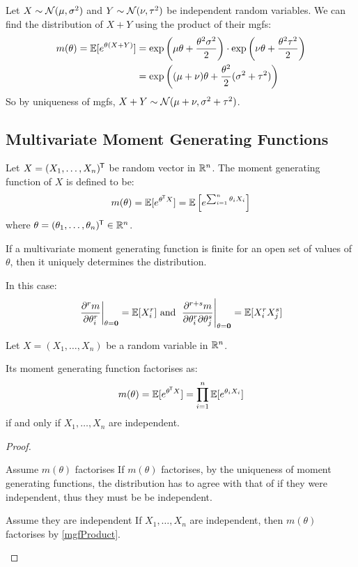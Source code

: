 \documentclass[../main.tex]{subfiles}
\begin{document}
\begin{example} \label{sumOfNormals}
  Let $X \sim \operatorname{\mathcal{N}}(\mu, \sigma^2)$ and $Y \sim \operatorname{\mathcal{N}}(\nu, \tau^2)$ be independent random variables.
  We can find the distribution of $X + Y$ using the product of their mgfs:
  \begin{align*}
    m(\theta) = \mathbb{E}[e^{\theta(X + Y)}] &= \exp\left(\mu \theta + \frac{\theta^2 \sigma^2}{2}\right) \cdot \exp\left(\nu \theta + \frac{\theta^2 \tau^2}{2}\right) \\
                                      &= \exp\left((\mu + \nu)\theta + \frac{\theta^2}{2}(\sigma^2 + \tau^2)\right)
  \end{align*}
  So by uniqueness of mgfs, $X + Y \sim \operatorname{\mathcal{N}}(\mu + \nu, \sigma^2 + \tau^2)$.
\end{example}
\subsection{Multivariate Moment Generating Functions}
\begin{definition}
  Let $X = (X_1, \ldots, X_n)^{{\mkern-1.5mu\mathsf{T}}}$ be random vector in $\mathbb{R}^{n}$.
  The moment generating function of $X$ is defined to be:
  \[
    m(\theta) = \mathbb{E}[e^{\theta^{{\mkern-1.5mu\mathsf{T}}} X}] = \mathbb{E}\left[e^{\sum_{i = 1}^{n} \theta_i X_i}\right]
  \]
  where $\theta = (\theta_1, \ldots, \theta_n)^{{\mkern-1.5mu\mathsf{T}}} \in \mathbb{R}^{n}$.
\end{definition}
\begin{theorem}
  If a multivariate moment generating function is finite for an open set of values of $\theta$, then it uniquely determines the distribution. \label{mgfMultiUnique}

  In this case:
  \[
    \at{\pderiv[r]{m}{\theta_i}}{\theta = \vec{0}} = \E[X^{r}_i] \text{ and } \at{\frac{\partial^{r + s}m}{\partial \theta_i^{r} \partial \theta_j^{s}}}{\theta = \vec{0}} = \E[X_i^{r}X_j^{s}]
  \]
\end{theorem}
\begin{proposition}
  Let $X = (X_1, \ldots, X_n)$ be a random variable in $\mathbb{R}^{n}$. \label{mgfFactor}

  Its moment generating function factorises as:
  \[
    m(\theta) = \mathbb{E}[e^{\theta^{{\mkern-1.5mu\mathsf{T}}}X}] = \prod_{i = 1}^{n} \mathbb{E}[e^{\theta_i X_i}]
  \]
  if and only if $X_1, \ldots, X_n$ are independent.
\end{proposition}
\begin{proof}
  \begin{proofdirection}{Assume $m(\theta)$ factorises}
    If $m(\theta)$ factorises, by the uniqueness of moment generating functions, the distribution has to agree with that of if they were independent, thus they must be be independent.
  \end{proofdirection}
  \begin{proofdirection}{Assume they are independent}
    If $X_1, \ldots, X_n$ are independent, then $m(\theta)$ factorises by \cref{mgfProduct}.
  \end{proofdirection}
\end{proof}
\end{document}
